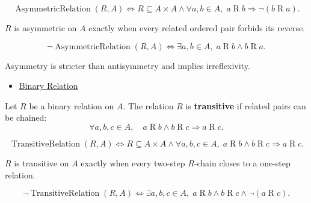 \begin{remark*}
\[
\operatorname{AsymmetricRelation}(R,A)
\Longleftrightarrow
R\subseteq A\times A
\land
\forall a,b\in A,\; a\mathrel{R}b \Rightarrow \lnot(b\mathrel{R}a).
\]
\end{remark*}

\begin{remark*}
$R$ is asymmetric on $A$ exactly when every related ordered pair forbids its
reverse.
\end{remark*}

\begin{remark*}
\[
\neg\operatorname{AsymmetricRelation}(R,A)
\Longleftrightarrow
\exists a,b\in A,\; a\mathrel{R}b \land b\mathrel{R}a.
\]
\end{remark*}

\begin{remark*}[Interpretation]
Asymmetry is stricter than antisymmetry and implies irreflexivity.
\end{remark*}

\begin{dependencies}
\begin{itemize}
  \item \hyperref[def:binary-relation]{Binary Relation}
\end{itemize}
\end{dependencies}

\begin{definition}
\label{def:rel-transitive}
Let $R$ be a binary relation on $A$.
The relation $R$ is \textbf{transitive} if related pairs can be chained:
\[
\forall a,b,c \in A,\quad
a \mathrel{R} b \land b \mathrel{R} c \Rightarrow a \mathrel{R} c.
\]
\end{definition}

\begin{remark*}
\[
\operatorname{TransitiveRelation}(R,A)
\Longleftrightarrow
R\subseteq A\times A
\land
\forall a,b,c\in A,\;
a\mathrel{R}b \land b\mathrel{R}c \Rightarrow a\mathrel{R}c.
\]
\end{remark*}

\begin{remark*}
$R$ is transitive on $A$ exactly when every two-step $R$-chain closes to a
one-step relation.
\end{remark*}

\begin{remark*}
\[
\neg\operatorname{TransitiveRelation}(R,A)
\Longleftrightarrow
\exists a,b,c\in A,\;
a\mathrel{R}b \land b\mathrel{R}c \land \lnot(a\mathrel{R}c).
\]
\end{remark*}

